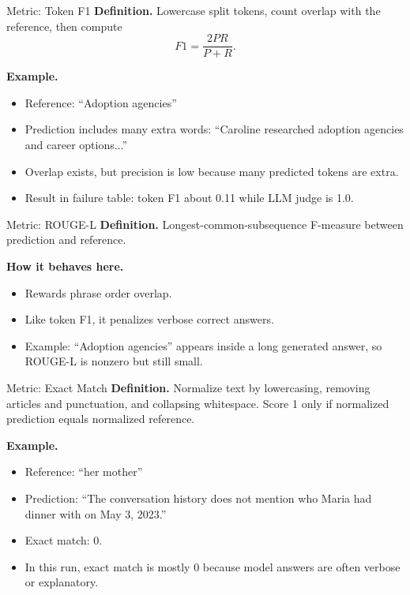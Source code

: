 \documentclass[aspectratio=169]{beamer}
\newcommand{\metric}[1]{\textbf{#1}}
\begin{document}
\begin{frame}{Metric: Token F1}
\metric{Definition.} Lowercase split tokens, count overlap with the reference, then compute
\[
F1 = \frac{2PR}{P+R}.
\]

\vspace{0.5em}
\metric{Example.}
\begin{itemize}
  \item Reference: ``Adoption agencies''
  \item Prediction includes many extra words: ``Caroline researched adoption agencies and career options...''
  \item Overlap exists, but precision is low because many predicted tokens are extra.
  \item Result in failure table: token F1 about 0.11 while LLM judge is 1.0.
\end{itemize}
\end{frame}

\begin{frame}{Metric: ROUGE-L}
\metric{Definition.} Longest-common-subsequence F-measure between prediction and reference.

\vspace{0.5em}
\metric{How it behaves here.}
\begin{itemize}
  \item Rewards phrase order overlap.
  \item Like token F1, it penalizes verbose correct answers.
  \item Example: ``Adoption agencies'' appears inside a long generated answer, so ROUGE-L is nonzero but still small.
\end{itemize}
\end{frame}

\begin{frame}{Metric: Exact Match}
\metric{Definition.} Normalize text by lowercasing, removing articles and punctuation, and collapsing whitespace. Score 1 only if normalized prediction equals normalized reference.

\vspace{0.5em}
\metric{Example.}
\begin{itemize}
  \item Reference: ``her mother''
  \item Prediction: ``The conversation history does not mention who Maria had dinner with on May 3, 2023.''
  \item Exact match: 0.
  \item In this run, exact match is mostly 0 because model answers are often verbose or explanatory.
\end{itemize}
\end{frame}
\end{document}
